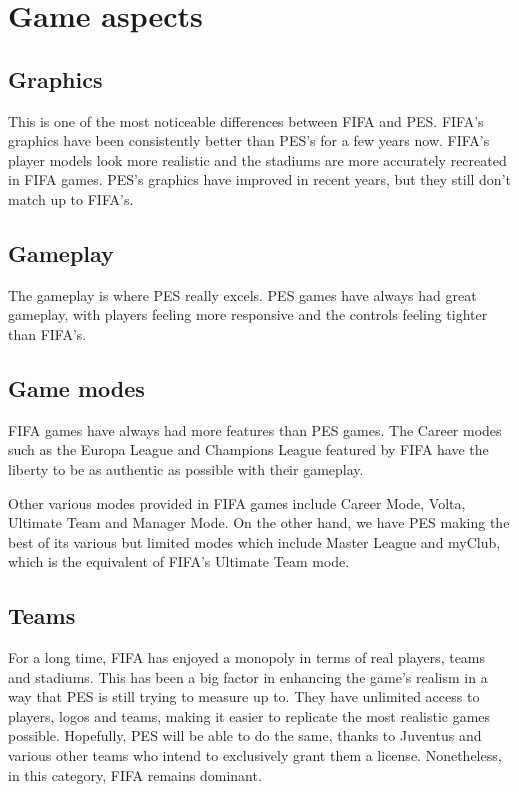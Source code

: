 \documentclass[12pt,twoside,english,a4paper]{article}
\begin{document}
\section{Game aspects} \label{aspects}




\subsection{Graphics} \label{aspects: graphics}
This is one of the most noticeable differences between FIFA and PES. FIFA’s graphics have been consistently better than PES’s for a few years now. FIFA’s player models look more realistic and the stadiums are more accurately recreated in FIFA games. PES’s graphics have improved in recent years, but they still don’t match up to FIFA’s.

\subsection{Gameplay} \label{aspects: gameplay}
The gameplay is where PES really excels. PES games have always had great gameplay, with players feeling more responsive and the controls feeling tighter than FIFA’s.

\subsection{Game modes} \label{aspects: modes}
FIFA games have always had more features than PES games. The Career modes such as the Europa League and Champions League featured by FIFA have the liberty to be as authentic as possible with their gameplay.

Other various modes provided in FIFA games include Career Mode, Volta, Ultimate Team and Manager Mode. On the other hand, we have PES making the best of its various but limited modes which include Master League and myClub, which is the equivalent of FIFA’s Ultimate Team mode.

\subsection{Teams} \label{aspects: teams}
For a long time, FIFA has enjoyed a monopoly in terms of real players, teams and stadiums. This has been a big factor in enhancing the game’s realism in a way that PES is still trying to measure up to. They have unlimited access to players, logos and teams, making it easier to replicate the most realistic games possible. Hopefully, PES will be able to do the same, thanks to Juventus and various other teams who intend to exclusively grant them a license. Nonetheless, in this category, FIFA remains dominant.
\end{document}
